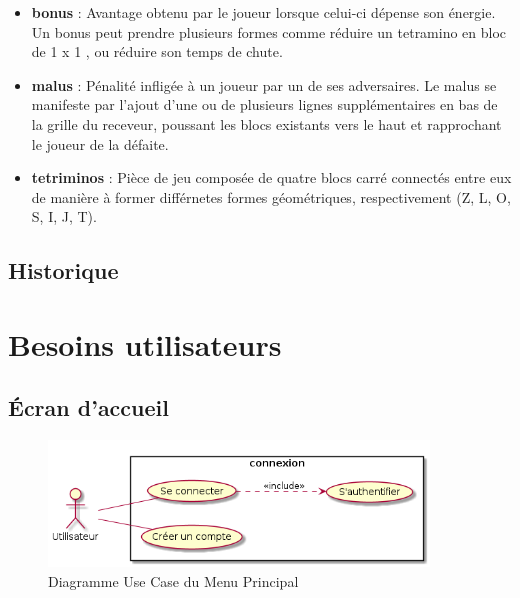 \documentclass{article}
\begin{document}
\begin{itemize}
	\item \textbf{bonus} : Avantage obtenu par le joueur lorsque celui-ci dépense son énergie. Un bonus peut prendre plusieurs formes comme réduire un tetramino en bloc de 1 x 1 , ou réduire son temps de chute. 
	\item \textbf{malus} : Pénalité infligée à un joueur par un de ses adversaires. Le malus se manifeste par l'ajout d'une ou de plusieurs lignes supplémentaires en bas de la grille du receveur, poussant les blocs existants vers le haut et rapprochant le joueur de la défaite.
	\item \textbf{tetriminos} : Pièce de jeu composée de quatre blocs carré connectés entre eux de manière à former différnetes formes géométriques, respectivement (Z, L, O, S, I, J, T). 
	
\end{itemize}

\subsection{Historique}

\section{Besoins utilisateurs}

\subsection{Écran d'accueil}

\begin{figure}[!h]
    \centering
    	\includegraphics[width=0.9\textwidth]{./uml/usescase/connexion/connexion.png}
    	\caption{Diagramme Use Case du Menu Principal}
    	\label{fig:main-menu}
\end{figure}
\end{document}
